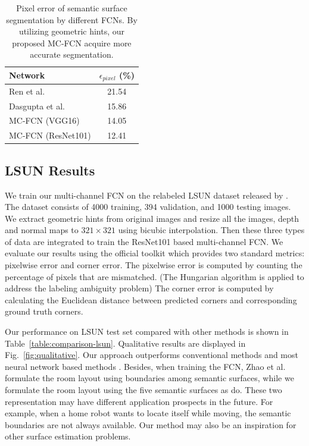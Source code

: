 \begin{table}
	\centering
	\begin{tabular}{lc}
		\toprule
		Network & $\epsilon_{pixel}$ (\%)\\
		\midrule
		Ren et al.~\cite{ren2016coarse} & 21.54 \\
		Dasgupta et al.~\cite{dasgupta2016delay} & 15.86 \\  
		\midrule
		MC-FCN (VGG16)  & 14.05 \\
		MC-FCN (ResNet101) & 12.41 \\
		\bottomrule
	\end{tabular}
	\caption{Pixel error of semantic surface segmentation by different FCNs. By utilizing geometric hints, our proposed MC-FCN acquire more accurate segmentation. }	
	\label{table:ablation}
\end{table}

\subsection{LSUN Results}
\label{sec:LSUN}
We train our multi-channel FCN on the relabeled LSUN dataset released by \cite{ren2016coarse}. The dataset consists of 4000 training, 394 validation, and 1000 testing images. We extract geometric hints from original images and resize all the images, depth and normal maps to $321\times321$ using bicubic interpolation. Then these three types of data are integrated to train the ResNet101 based multi-channel FCN. We evaluate our results using the official toolkit which provides two standard metrics: pixelwise error and corner error. The pixelwise error is computed by counting the percentage of pixels that are mismatched. (The Hungarian algorithm is applied to address the labeling ambiguity problem) The corner error is computed by calculating the Euclidean distance between predicted corners and corresponding ground truth corners.

Our performance on LSUN test set compared with other methods is shown in Table~\ref{table:comparison-lsun}. Qualitative results are displayed in Fig.~\ref{fig:qualitative}. Our approach outperforms conventional methods \cite{hedau2009recovering,mallya2015learning} and most neural network based methods  \cite{zhang2017learning,dasgupta2016delay,ren2016coarse,LeeRoomNet17}. 
%
Besides, when training the FCN, Zhao et al.~\cite{zhao2017physics} formulate the room layout using boundaries among semantic surfaces, while we formulate the room layout using the five semantic surfaces as \cite{dasgupta2016delay} do. These two representation may have different application prospects in the future. For example, when a home robot wants to locate itself while moving, the semantic boundaries are not always available. Our method may also be an inspiration for other surface estimation problems.

